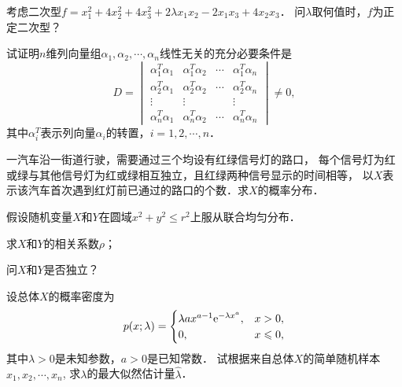 \documentclass[plain,noanswer,medmath]{../../template/jnuexam}
\begin{document}

\begin{problem}
考虑二次型$f = x_1^2+ 4x_2^2+ 4x_3^2+ 2\lambda x_1x_2 - 2x_1x_3 + 4x_2x_3$．
问$\lambda$取何值时，$f$为正定二次型？
\end{problem}



\begin{problem}
试证明$n$维列向量组$\alpha_1,\alpha_2, \cdots ,\alpha_n$线性无关的充分必要条件是
$$D = \begin{vmatrix}
  \alpha_1^T\alpha_1 & \alpha_1^T\alpha_2 & \cdots & \alpha_1^T\alpha_n \\
  \alpha_2^T\alpha_1 & \alpha_2^T\alpha_2 & \cdots & \alpha_2^T\alpha_n \\
              \vdots &             \vdots &        & \vdots \\
  \alpha_n^T\alpha_1 & \alpha_n^T\alpha_2 & \cdots & \alpha_n^T\alpha_n
\end{vmatrix} \ne 0,$$
其中$\alpha_i^T$表示列向量$\alpha_i$的转置，$i = 1,2, \cdots ,n$．
\end{problem}



\begin{problem}
一汽车沿一街道行驶，需要通过三个均设有红绿信号灯的路口，
每个信号灯为红或绿与其他信号灯为红或绿相互独立，且红绿两种信号显示的时间相等，
以$X$表示该汽车首次遇到红灯前已通过的路口的个数．求$X$的概率分布．
\end{problem}



\begin{problem}
假设随机变量$X$和$Y$在圆域$x^2 + y^2 \le r^2$上服从联合均匀分布．\par
\begin{enumerate*}
\item 求$X$和$Y$的相关系数$\rho$；
\item 问$X$和$Y$是否独立？
\end{enumerate*}
\end{problem}



\begin{problem}
设总体$X$的概率密度为
$$p(x;\lambda) = \begin{cases}
  \lambda ax^{a-1}\mathrm{e}^{-\lambda x^a}, & x > 0, \\
                                  0, & x \leqslant 0,
\end{cases}$$
其中$\lambda > 0$是未知参数，$a > 0$是已知常数．
试根据来自总体$X$的简单随机样本$x_1,x_2, \cdots ,x_n$,
求$\lambda$的最大似然估计量$\hat{\lambda}$．
\end{problem}
\end{document}
